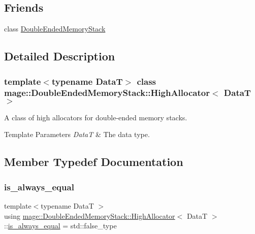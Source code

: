 \subsection*{Friends}
\begin{DoxyCompactItemize}
\item 
class \mbox{\hyperlink{classmage_1_1_double_ended_memory_stack_1_1_high_allocator_a10ae729d55b8c0017057250445835680}{Double\+Ended\+Memory\+Stack}}
\end{DoxyCompactItemize}


\subsection{Detailed Description}
\subsubsection*{template$<$typename DataT$>$\newline
class mage\+::\+Double\+Ended\+Memory\+Stack\+::\+High\+Allocator$<$ Data\+T $>$}

A class of high allocators for double-\/ended memory stacks.


\begin{DoxyTemplParams}{Template Parameters}
{\em DataT} & The data type. \\
\hline
\end{DoxyTemplParams}


\subsection{Member Typedef Documentation}
\mbox{\label{classmage_1_1_double_ended_memory_stack_1_1_high_allocator_af6ec362496ffae52532f1bb57170edf7}} 
\subsubsection{\texorpdfstring{is\+\_\+always\+\_\+equal}{is\_always\_equal}}
{\footnotesize\ttfamily template$<$typename DataT $>$ \\
using \mbox{\hyperlink{classmage_1_1_double_ended_memory_stack_1_1_high_allocator}{mage\+::\+Double\+Ended\+Memory\+Stack\+::\+High\+Allocator}}$<$ DataT $>$\+::\mbox{\hyperlink{classmage_1_1_double_ended_memory_stack_1_1_high_allocator_af6ec362496ffae52532f1bb57170edf7}{is\+\_\+always\+\_\+equal}} =  std\+::false\+\_\+type}

